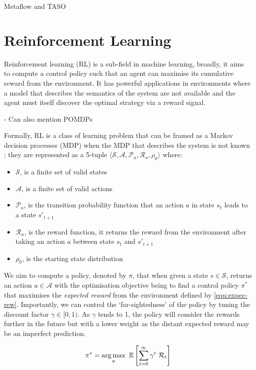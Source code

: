 Metaflow and TASO

\section{Reinforcement Learning}
Reinforcement learning (RL) is a sub-field in machine learning, broadly, it aims to compute a control policy such that an agent can maximise its cumulative reward from the environment. It has powerful applications in environments where a model that describes the semantics of the system are not available and the agent must itself discover the optimal strategy via a reward signal.

- Can also mention POMDPs

Formally, RL is a class of learning problem that can be framed as a Markov decision processes (MDP) when the MDP that describes the system is not known \cite{bellman1957}; they are represented as a 5-tuple $\langle \mathcal{S}, \mathcal{A}, \mathcal{P}_a, \mathcal{R}_a, \rho_0 \rangle$ where:

\begin{itemize}
  \item $\mathcal{S}$, is a finite set of valid states
  \item $\mathcal{A}$, is a finite set of valid actions
  \item $\mathcal{P}_a$, is the transition probability function that an action $a$ in state $s_t$ leads to a state $s'_{t+1}$
  \item $\mathcal{R}_a$, is the reward function, it returns the reward from the environment after taking an action $a$ between state $s_t$ and $s'_{t+1}$
  \item $\rho_0$, is the starting state distribution
\end{itemize}

We aim to compute a policy, denoted by $\pi$, that when given a state $s \in \mathcal{S}$, returns an action $a \in \mathcal{A}$ with the optimisation objective being to find a control policy $\pi^*$ that maximises the \textit{expected reward} from the environment defined by \ref{equ:expec-rew}. Importantly, we can control the `far-sightedness' of the policy by tuning the discount factor $\gamma \in [0, 1)$. As $\gamma$ tends to 1, the policy will consider the rewards further in the future but with a lower weight as the distant expected reward may be an imperfect prediction.

\begin{equation}
  \label{equ:expec-rew}
  \pi^* = \operatorname*{arg\,max}_\pi~\mathbb{E} \left[ \sum^\infty_{t=0} \gamma^t~\mathcal{R}_t \right]
\end{equation}

